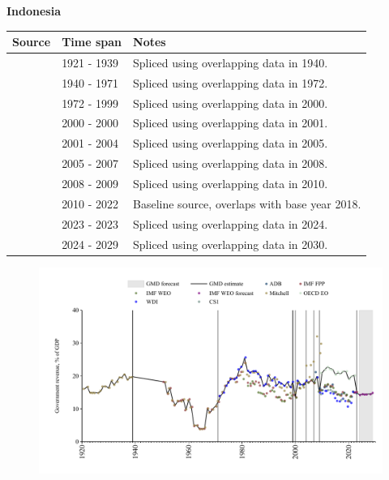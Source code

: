 \documentclass[12pt,a4paper,landscape]{article}
\begin{document}
\begin{adjustbox}{max totalsize={\paperwidth}{\paperheight},center}
\begin{minipage}[t][\textheight][t]{\textwidth}
\vspace*{0.5cm}
{}
\begin{center}
{\Large\bfseries Indonesia}
\end{center}
\vspace{0.5cm}
\begin{table}[H]
\centering
\small
\begin{tabular}{|l|l|l|}
\hline
\textbf{Source} & \textbf{Time span} & \textbf{Notes} \\
\hline
\rowcolor{white}\cite{Mitchell}& 1921 - 1939 &Spliced using overlapping data in 1940.\\
\rowcolor{lightgray}\cite{IMF_FPP}& 1940 - 1971 &Spliced using overlapping data in 1972.\\
\rowcolor{white}\cite{WDI}& 1972 - 1999 &Spliced using overlapping data in 2000.\\
\rowcolor{lightgray}\cite{IMF_WEO}& 2000 - 2000 &Spliced using overlapping data in 2001.\\
\rowcolor{white}\cite{WDI}& 2001 - 2004 &Spliced using overlapping data in 2005.\\
\rowcolor{lightgray}\cite{IMF_WEO}& 2005 - 2007 &Spliced using overlapping data in 2008.\\
\rowcolor{white}\cite{WDI}& 2008 - 2009 &Spliced using overlapping data in 2010.\\
\rowcolor{lightgray}\cite{OECD_EO}& 2010 - 2022 &Baseline source, overlaps with base year 2018.\\
\rowcolor{white}\cite{ADB}& 2023 - 2023 &Spliced using overlapping data in 2024.\\
\rowcolor{lightgray}\cite{IMF_WEO_forecast}& 2024 - 2029 &Spliced using overlapping data in 2030.\\
\hline
\end{tabular}
\end{table}
\begin{figure}[H]
\centering
\includegraphics[width=\textwidth,height=0.6\textheight,keepaspectratio]{graphs/IDN_govrev_GDP.pdf}
\end{figure}
\end{minipage}
\end{adjustbox}
\end{document}
